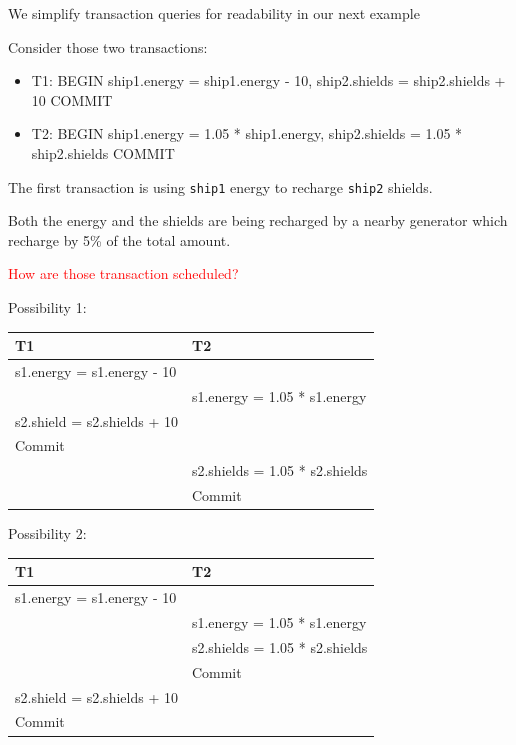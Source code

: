 \documentclass{beamer}
\newcommand{\red}[1]{
\textcolor{red}{#1}
}
\begin{document}
\begin{slide}{
\item We simplify transaction queries for readability in our next example  
\pause
\item Consider those two transactions:
\begin{itemize}
	\item T1:	BEGIN   ship1.energy = ship1.energy - 10, ship2.shields = ship2.shields + 10    COMMIT
	\item T2:	BEGIN   ship1.energy = 1.05 * ship1.energy,  ship2.shields = 1.05 * ship2.shields   COMMIT
	
\end{itemize}
\item The first transaction is using \texttt{ship1} energy to recharge \texttt{ship2} shields.  
\item Both the energy and the shields are being recharged by a nearby generator which recharge by 5\% of the total amount.
\item \red{How are those transaction scheduled?}	
}\end{slide}


\begin{slide}{
\item Possibility 1:
\begin{table}
	\tiny
	\begin{tabular}{l|l}
		T1 & T2\\
		\hline
		s1.energy = s1.energy - 10 & \\
		& s1.energy = 1.05 * s1.energy \\
		s2.shield = s2.shields + 10 & \\
		Commit & \\
		& s2.shields = 1.05 * s2.shields \\
		& Commit
	\end{tabular}
\end{table}
}\end{slide}

\begin{slide}{
		\item Possibility 2:
		\begin{table}
			\tiny
			\begin{tabular}{l|l}
				T1 & T2\\
				\hline
				s1.energy = s1.energy - 10 & \\
				& s1.energy = 1.05 * s1.energy \\
				& s2.shields = 1.05 * s2.shields \\
				& Commit \\	
				s2.shield = s2.shields + 10 & \\
				Commit & \\
			\end{tabular}
		\end{table}
}\end{slide}
\end{document}
